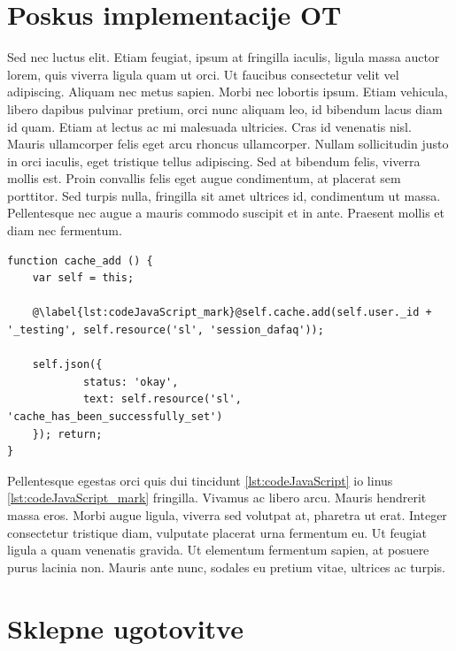 \documentclass[a4paper, 12pt, twoside]{book}
\begin{document}
\chapter{Poskus implementacije OT}

Sed nec luctus elit. Etiam feugiat, ipsum at fringilla iaculis, ligula massa auctor lorem, quis viverra ligula quam ut orci. Ut faucibus consectetur velit vel adipiscing. Aliquam nec metus sapien. Morbi nec lobortis ipsum. Etiam vehicula, libero dapibus pulvinar pretium, orci nunc aliquam leo, id bibendum lacus diam id quam. Etiam at lectus ac mi malesuada ultricies. Cras id venenatis nisl. Mauris ullamcorper felis eget arcu rhoncus ullamcorper. Nullam sollicitudin justo in orci iaculis, eget tristique tellus adipiscing. Sed at bibendum felis, viverra mollis est. Proin convallis felis eget augue condimentum, at placerat sem porttitor. Sed turpis nulla, fringilla sit amet ultrices id, condimentum ut massa. Pellentesque nec augue a mauris commodo suscipit et in ante. Praesent mollis et diam nec fermentum.

\begin{lstlisting}[caption={Interdum pretium}, label={lst:codeJavaScript}, title={Exampelus \ref{lst:codeJavaScript}: Interdum pretium}]
function cache_add () {
	var self = this;

	@\label{lst:codeJavaScript_mark}@self.cache.add(self.user._id + '_testing', self.resource('sl', 'session_dafaq'));

	self.json({
			status: 'okay',
			text: self.resource('sl', 'cache_has_been_successfully_set')
	}); return;
}
\end{lstlisting}

Pellentesque egestas orci quis dui tincidunt \ref{lst:codeJavaScript} io linus \ref{lst:codeJavaScript_mark} fringilla. Vivamus ac libero arcu. Mauris hendrerit massa eros. Morbi augue ligula, viverra sed volutpat at, pharetra ut erat. Integer consectetur tristique diam, vulputate placerat urna fermentum eu. Ut feugiat ligula a quam venenatis gravida. Ut elementum fermentum sapien, at posuere purus lacinia non. Mauris ante nunc, sodales eu pretium vitae, ultrices ac turpis.

\chapter{Sklepne ugotovitve}
\end{document}
